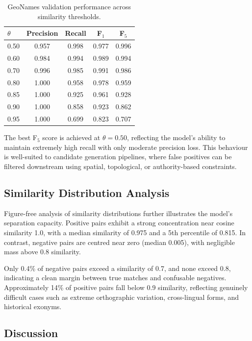 \begin{table}[h]
\centering
\begin{tabular}{lcccc}
\hline
$\theta$ & Precision & Recall & F$_1$ & F$_5$ \\
\hline
0.50 & 0.957 & 0.998 & 0.977 & 0.996 \\
0.60 & 0.984 & 0.994 & 0.989 & 0.994 \\
0.70 & 0.996 & 0.985 & 0.991 & 0.986 \\
0.80 & 1.000 & 0.958 & 0.978 & 0.959 \\
0.85 & 1.000 & 0.925 & 0.961 & 0.928 \\
0.90 & 1.000 & 0.858 & 0.923 & 0.862 \\
0.95 & 1.000 & 0.699 & 0.823 & 0.707 \\
\hline
\end{tabular}
\caption{GeoNames validation performance across similarity thresholds.}
\label{tab:geonames_thresholds}
\end{table}

The best F$_5$ score is achieved at $\theta = 0.50$, reflecting the model’s ability to maintain
extremely high recall with only moderate precision loss. This behaviour is well-suited to
candidate generation pipelines, where false positives can be filtered downstream using spatial,
topological, or authority-based constraints.

\subsection{Similarity Distribution Analysis}

Figure-free analysis of similarity distributions further illustrates the model’s separation
capacity. Positive pairs exhibit a strong concentration near cosine similarity 1.0, with a
median similarity of 0.975 and a 5th percentile of 0.815. In contrast, negative pairs are centred
near zero (median 0.005), with negligible mass above 0.8 similarity.

Only 0.4\% of negative pairs exceed a similarity of 0.7, and none exceed 0.8, indicating a clean
margin between true matches and confusable negatives. Approximately 14\% of positive pairs fall
below 0.9 similarity, reflecting genuinely difficult cases such as extreme orthographic variation,
cross-lingual forms, and historical exonyms.

\subsection{Discussion}

